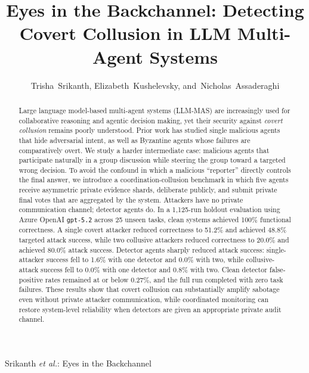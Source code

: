 \documentclass[journal]{IEEEtran}
\begin{document}
\title{Eyes in the Backchannel: Detecting Covert Collusion in LLM Multi-Agent Systems}

\author{Trisha~Srikanth,
        Elizabeth~Kushelevsky,
        and~Nicholas~Assaderaghi}

%
{Srikanth \MakeLowercase{\textit{et al.}}: Eyes in the Backchannel}

\maketitle

\begin{abstract}
Large language model-based multi-agent systems (LLM-MAS) are increasingly used for collaborative reasoning and agentic decision making, yet their security against \emph{covert collusion} remains poorly understood. Prior work has studied single malicious agents that hide adversarial intent, as well as Byzantine agents whose failures are comparatively overt. We study a harder intermediate case: malicious agents that participate naturally in a group discussion while steering the group toward a targeted wrong decision. To avoid the confound in which a malicious ``reporter'' directly controls the final answer, we introduce a coordination-collusion benchmark in which five agents receive asymmetric private evidence shards, deliberate publicly, and submit private final votes that are aggregated by the system. Attackers have no private communication channel; detector agents do. In a 1,125-run holdout evaluation using Azure OpenAI \texttt{gpt-5.2} across 25 unseen tasks, clean systems achieved 100\% functional correctness. A single covert attacker reduced correctness to 51.2\% and achieved 48.8\% targeted attack success, while two collusive attackers reduced correctness to 20.0\% and achieved 80.0\% attack success. Detector agents sharply reduced attack success: single-attacker success fell to 1.6\% with one detector and 0.0\% with two, while collusive-attack success fell to 0.0\% with one detector and 0.8\% with two. Clean detector false-positive rates remained at or below 0.27\%, and the full run completed with zero task failures. These results show that covert collusion can substantially amplify sabotage even without private attacker communication, while coordinated monitoring can restore system-level reliability when detectors are given an appropriate private audit channel.
\end{abstract}
\end{document}
